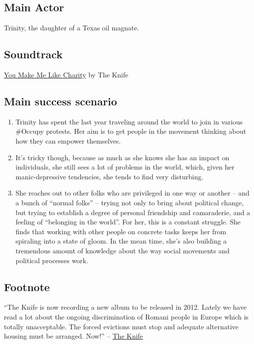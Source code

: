 \subsection{Main Actor}

Trinity, the daughter of a Texas oil magnate.

\subsection{Soundtrack}

\href{http://www.youtube.com/watch?v=NWsX9ggfL2Q}{You Make Me Like
Charity} by The Knife

\subsection{Main success scenario}

\begin{enumerate}
\item
  Trinity has spent the last year traveling around the world to join in
  various \#Occupy protests. Her aim is to get people in the movement
  thinking about how they can empower themselves.
\item
  It's tricky though, because as much as she knows she has an impact on
  individuals, she still sees a lot of problems in the world, which,
  given her manic-depressive tendencies, she tends to find very
  disturbing.
\item
  She reaches out to other folks who are privileged in one way or
  another -- and a bunch of ``normal folks'' -- trying not only to bring
  about political change, but trying to establish a degree of personal
  friendship and camaraderie, and a feeling of ``belonging in the
  world''. For her, this is a constant struggle. She finds that working
  with other people on concrete tasks keeps her from spiraling into a
  state of gloom. In the mean time, she's also building a tremendous
  amount of knowledge about the way social movements and political
  processes work.
\end{enumerate}
\subsection{Footnote}

``The Knife is now recording a new album to be released in 2012. Lately
we have read a lot about the ongoing discrimination of Romani people in
Europe which is totally unacceptable. The forced evictions must stop and
adequate alternative housing must be arranged. Now!'' --
\href{http://theknife.net/take-action-for-the-housing-rights-of-roma-in-rome}{The
Knife}
